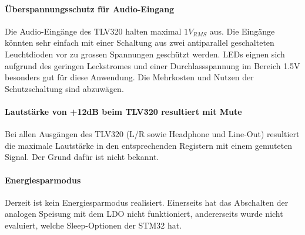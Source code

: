 \paragraph{Überspannungsschutz für Audio-Eingang}

Die Audio-Eingänge des TLV320 halten maximal $1\si{V_{RMS}}$ aus. Die Eingänge könnten sehr einfach mit einer Schaltung aus zwei antiparallel geschalteten Leuchtdioden vor zu grossen Spannungen geschützt werden. LEDs eignen sich aufgrund des geringen Leckstromes und einer Durchlassspannung im Bereich 1.5V besonders gut für diese Anwendung.
Die Mehrkosten und Nutzen der Schutzschaltung sind abzuwägen.

\paragraph{Lautstärke von +12dB beim TLV320 resultiert mit Mute}

Bei allen Ausgängen des TLV320 (L/R sowie Headphone und Line-Out) resultiert die maximale Lautstärke in den entsprechenden Registern mit einem gemuteten Signal.
Der Grund dafür ist nicht bekannt.

\paragraph{Energiesparmodus}

Derzeit ist kein Energiesparmodus realisiert. Einerseits hat das Abschalten der analogen Speisung mit dem LDO nicht funktioniert, andererseits wurde nicht evaluiert, welche Sleep-Optionen der STM32 hat.




